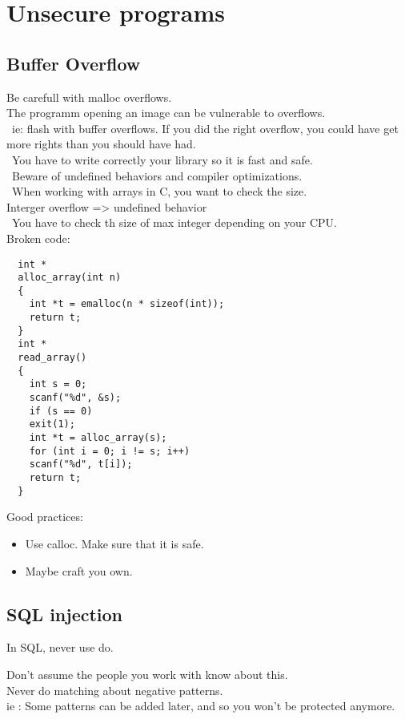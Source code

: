 \documentclass[a4paper,11pt]{article}
\begin{document}
\section{Unsecure programs}
\subsection{Buffer Overflow}
Be carefull with malloc overflows.\\
The programm opening an image can be vulnerable to overflows.\\
\
ie: flash with buffer overflows. If you did the right overflow, you could have get more rights than you should have had.\\
\
You have to write correctly your library so it is fast and safe.\\
\
Beware of undefined behaviors and compiler optimizations.\\
\
When working with arrays in C, you want to check the size.\\
Interger overflow => undefined behavior\\
\
You have to check th size of max integer depending on your CPU.\\

Broken code:

\begin{verbatim}
  int *
  alloc_array(int n)
  {
    int *t = emalloc(n * sizeof(int));
    return t;
  } 
  int * 
  read_array() 
  { 
    int s = 0; 
    scanf("%d", &s); 
    if (s == 0) 
    exit(1); 
    int *t = alloc_array(s); 
    for (int i = 0; i != s; i++) 
    scanf("%d", t[i]); 
    return t; 
  }
\end{verbatim}

Good practices:

\begin{itemize}
\item Use calloc. Make sure that it is safe.
\item Maybe craft you own.
\end{itemize}

\subsection{SQL injection}
In SQL, never use do.

Don't assume the people you work with know about this.\\
Never do matching about negative patterns.\\
ie : Some patterns can be added later, and so you won't be protected anymore.\\
\end{document}
